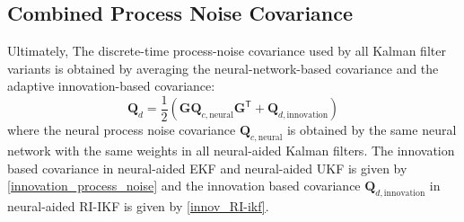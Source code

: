 \documentclass[conference]{IEEEtran}
\begin{document}
\subsection{Combined Process Noise Covariance}
Ultimately, The discrete-time process-noise covariance used by all Kalman filter variants is obtained by averaging the neural-network-based covariance and the adaptive innovation-based covariance:
\begin{equation}
\label{combined_process_noise}
\mathbf{Q}_{d}
=
\frac{1}{2}
\left(
\mathbf{G}\mathbf{Q}_{c,\mathrm{neural}}\mathbf{G}^{\mathsf{T}}
+
\mathbf{Q}_{d,\mathrm{innovation}}
\right)
\end{equation}
where the neural process noise covariance \(\mathbf{Q}_{c,\mathrm{neural}}\) is obtained by the same neural network with the same weights in all neural-aided Kalman filters. The innovation based covariance in neural-aided EKF and neural-aided UKF is given by \eqref{innovation_process_noise} and the innovation based covariance \(\mathbf{Q}_{d,\mathrm{innovation}}\) in neural-aided RI-IKF is given by \eqref{innov_RI-ikf}.

\end{document}
